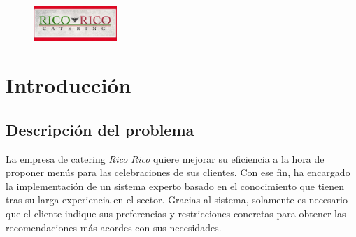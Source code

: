 % 

\begin{figure}
  \vspace{-20pt}
  \begin{center}
    \includegraphics[width=0.28\textwidth]{figures/ricorico}
  \end{center}
  \vspace{-20pt}
\end{figure}

\section{Introducción}
\subsection{Descripción del problema}
La empresa de catering \emph{Rico Rico} quiere mejorar su eficiencia a la hora
de proponer menús para las celebraciones de sus clientes. Con ese fin, ha
encargado la implementación de un sistema experto basado en el conocimiento que
tienen tras su larga experiencia en el sector. Gracias al sistema, solamente es
necesario que el cliente indique sus preferencias y restricciones concretas
para obtener las recomendaciones más acordes con sus necesidades.


